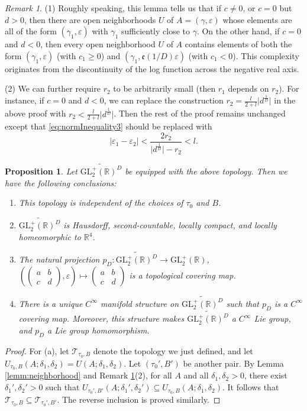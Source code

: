 \documentclass[12pt]{amsart}
\numberwithin{equation}{section}
\theoremstyle{plain}
\newtheorem{prop}[thm]{Proposition}
\theoremstyle{definition}
\theoremstyle{remark}
\newtheorem{rema}[thm]{Remark}
\newcommand\tbtmat[4]{\left(\begin{smallmatrix}{#1} & {#2} \\ {#3} & {#4}\end{smallmatrix}\right)}
\newcommand*\abs[1]{\lvert#1\rvert}
\newcommand\etp[1]{\mathfrak{e}\left(#1\right)}
\newcommand\numR{\mathbb{R}}
\newcommand\glpR{\mathrm{GL}_2^{+}(\mathbb{R})}
\newcommand\elesltRaDs[5]{\left(\left(\begin{smallmatrix}{#1} & {#2} \\ {#3} & {#4}\end{smallmatrix}\right),{#5}\right)}
\newcommand\Dcover[2]{\widetilde{#1^{#2}}}
\begin{document}
\begin{appendix}
\begin{rema}
\label{rema:openNeighborhood}
(1) Roughly speaking, this lemma tells us that if $c\neq0$, or $c=0$ but $d>0$, then there are open neighborhoods $U$ of $A=(\gamma,\varepsilon)$ whose elements are all of the form $(\gamma_1,\varepsilon)$ with $\gamma_1$ sufficiently close to $\gamma$. On the other hand, if $c=0$ and $d<0$, then every open neighborhood $U$ of $A$ contains elements of both the form $(\gamma_1,\varepsilon)$ (with $c_1\geq0$) and $(\gamma_1,\etp{1/D}\varepsilon)$ (with $c_1<0$). This complexity originates from the discontinuity of the log function across the negative real axis.

(2) We can further require $r_2$ to be arbitrarily small (then $r_1$ depends on $r_2$). For instance, if $c=0$ and $d<0$, we can replace the construction $r_2=\frac{l}{2+l}\abs{d^{\frac{1}{D}}}$ in the above proof with $r_2<\frac{l}{2+l}\abs{d^{\frac{1}{D}}}$. Then the rest of the proof remains unchanged except that \eqref{eq:normInequality3} should be replaced with
$$
\abs{\varepsilon_1-\varepsilon_2}<\frac{2r_2}{\abs{d^{\frac{1}{D}}}-r_2}<l.
$$
\end{rema}

\begin{prop}
\label{prop:LieDcover}
Let $\Dcover{\glpR}{D}$ be equipped with the above topology. Then we have the following conclusions:
\begin{enumerate}
  \item This topology is independent of the choices of $\tau_0$ and $B$.
  \item $\Dcover{\glpR}{D}$ is Hausdorff, second-countable, locally compact, and locally homeomorphic to $\numR^4$.
  \item The natural projection $p_D\colon\Dcover{\glpR}{D}\rightarrow\glpR$, $\elesltRaDs{a}{b}{c}{d}{\varepsilon}\mapsto\tbtmat{a}{b}{c}{d}$ is a topological covering map.
  \item There is a unique $C^\infty$ manifold structure on $\Dcover{\glpR}{D}$ such that $p_D$ is a $C^\infty$ covering map. Moreover, this structure makes $\Dcover{\glpR}{D}$ a $C^\infty$ Lie group, and $p_D$ a Lie group homomorphism.
\end{enumerate}
\end{prop}
\begin{proof}
For (a), let $\mathscr{T}_{\tau_0,B}$ denote the topology we just defined, and let $U_{\tau_0,B}(A;\delta_1,\delta_2)=U(A;\delta_1,\delta_2)$. Let $(\tau_0',B')$ be another pair. By Lemma \ref{lemm:neighborhood} and Remark \ref{rema:openNeighborhood}(2), for all $A$ and all $\delta_1,\delta_2>0$, there exist $\delta_1',\delta_2'>0$ such that $U_{\tau_0',B'}(A;\delta_1',\delta_2')\subseteq U_{\tau_0,B}(A;\delta_1,\delta_2)$. It follows that $\mathscr{T}_{\tau_0,B}\subseteq\mathscr{T}_{\tau_0',B'}$. The reverse inclusion is proved similarly.


\end{proof}
\end{appendix}
\end{document}
